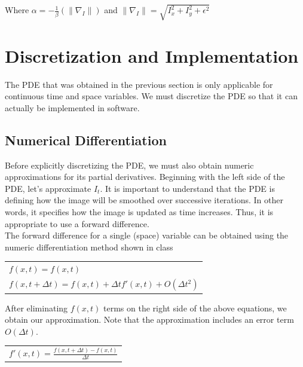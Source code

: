 \documentclass{article}
\begin{document}
    \noindent
    Where $\alpha = -\frac{1}{\beta}(\| \nabla_{I} \|)$ and $\| \nabla_{I} \| = \sqrt{I_{x}^2 + I_{y}^2 + \epsilon^2}$\\



  \newpage
  \section{Discretization and Implementation}
  \noindent
  The PDE that was obtained in the previous section is only applicable for continuous
  time and space variables. We must discretize the PDE so that it can actually be implemented in software.\\

  \subsection{Numerical Differentiation}
  \noindent
  Before explicitly discretizing the PDE, we must also obtain numeric approximations for its partial
  derivatives. Beginning with the left side of the PDE, let's approximate $I_{t}$. 
  It is important to understand that the PDE is defining how the image will be smoothed
  over successive iterations. In other words, it specifies how the image is updated as time increases.
  Thus, it is appropriate to use a forward difference.\\

  \noindent
  The forward difference for a single (space) variable can be obtained using the 
  numeric differentiation method shown in class
  \begin{center}
    \begin{tabular}{l}
      \vspace{12pt}
      $f(x,t) = f(x,t)$\\
      $f(x,t+\Delta t) = f(x,t) + \Delta t f'(x,t) + O(\Delta t^2)$\\
    \end{tabular}
  \end{center}

  \noindent
  After eliminating $f(x,t)$ terms on the right side of the above equations,
  we obtain our approximation. Note that the approximation includes an error term $O(\Delta t)$.
  \begin{center}
    \begin{tabular}{l}
      $f'(x,t) = \frac{f(x,t+\Delta t) - f(x,t)}{\Delta t}$\\
    \end{tabular}
  \end{center}
\end{document}
